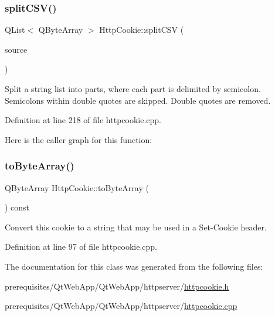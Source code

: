 \subsubsection{\texorpdfstring{split\+C\+S\+V()}{splitCSV()}}
{\footnotesize\ttfamily Q\+List$<$ Q\+Byte\+Array $>$ Http\+Cookie\+::split\+C\+SV (\begin{DoxyParamCaption}\item[{const Q\+Byte\+Array}]{source }\end{DoxyParamCaption})\hspace{0.3cm}{\ttfamily [static]}}

Split a string list into parts, where each part is delimited by semicolon. Semicolons within double quotes are skipped. Double quotes are removed. 

Definition at line 218 of file httpcookie.\+cpp.

Here is the caller graph for this function\+:
\mbox{\label{classstefanfrings_1_1_http_cookie_aef937847dbebf7290e94b94afbb8f9a1}} 
\subsubsection{\texorpdfstring{to\+Byte\+Array()}{toByteArray()}}
{\footnotesize\ttfamily Q\+Byte\+Array Http\+Cookie\+::to\+Byte\+Array (\begin{DoxyParamCaption}{ }\end{DoxyParamCaption}) const}

Convert this cookie to a string that may be used in a Set-\/\+Cookie header. 

Definition at line 97 of file httpcookie.\+cpp.



The documentation for this class was generated from the following files\+:\begin{DoxyCompactItemize}
\item 
prerequisites/\+Qt\+Web\+App/\+Qt\+Web\+App/httpserver/\mbox{\hyperlink{httpcookie_8h}{httpcookie.\+h}}\item 
prerequisites/\+Qt\+Web\+App/\+Qt\+Web\+App/httpserver/\mbox{\hyperlink{httpcookie_8cpp}{httpcookie.\+cpp}}\end{DoxyCompactItemize}
